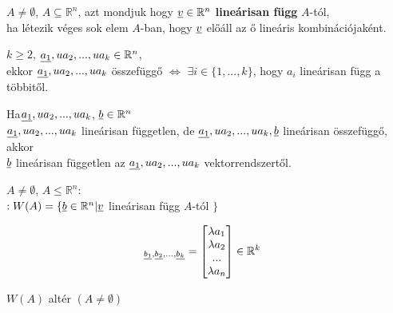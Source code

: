 	\begin{frame}
		\begin{tcolorbox}[title={Def.: Lineáris függőség}]
			$A \neq \emptyset$, $A \subseteq \mathbb{R}^n$, azt mondjuk hogy $\underline{v} \in \mathbb{R}^n$ \textbf{lineárisan függ} $A$-tól,\\
			ha létezik véges sok elem $A$-ban, hogy $\underline{v}$ előáll az ő lineáris kombinációjaként.
		\end{tcolorbox}
		
		\begin{tcolorbox}[title={Def.: Lineáris függőség}]
			$k \geq 2$, $\underline{a_1}, u{a_2}, ..., u{a_k} \in \mathbb{R}^n$,\\
			ekkor $\underline{a_1}, u{a_2}, ..., u{a_k}$ összefüggő $\iff$ $\exists i \in \{ 1, ..., k \}$, hogy $a_i$ lineárisan függ a többitől.
		\end{tcolorbox}
		
		\begin{tcolorbox}[title={Áll.: Lineáris függőség}]
			Ha$\underline{a_1}, u{a_2}, ..., u{a_k}$, $\underline{b} \in \mathbb{R}^n$\\		
			$\underline{a_1}, u{a_2}, ..., u{a_k}$ lineárisan független, de $\underline{a_1}, u{a_2}, ..., u{a_k}, \underline{b}$ lineárisan összefüggő, akkor\\
			$\underline{b}$ lineárisan független az $\underline{a_1}, u{a_2}, ..., u{a_k}$ vektorrendszertől.	
		\end{tcolorbox}
		
		\begin{tcolorbox}[title={Def.: Halmaz által generált altér / Lineáris Burok}]
			$A \neq \emptyset$, $A \leq \mathbb{R}^n$:\\
			$: W(A) = \{ \underline{b} \in \mathbb{R}^n | \underline{v}$ lineárisan függ $A$-tól $\}$
		\end{tcolorbox}
		
		\begin{tcolorbox}[title={Def.: Vektor koordinátái}]
			\begin{align}
				[a]_{\u{b_1}, \u{b_2}, ..., \u{b_k}} &= \begin{bmatrix}
					{\lambda}a_1 \\
					{\lambda}a_2 \\
					... \\
					{\lambda}a_n
				\end{bmatrix} \in \mathbb{R}^k
			\end{align}
		\end{tcolorbox}
		
		\begin{tcolorbox}[title={Tétel: Altér}]
			$W(A)$ altér $(A \neq \emptyset)$
		\end{tcolorbox}
	\end{frame}
	
	


